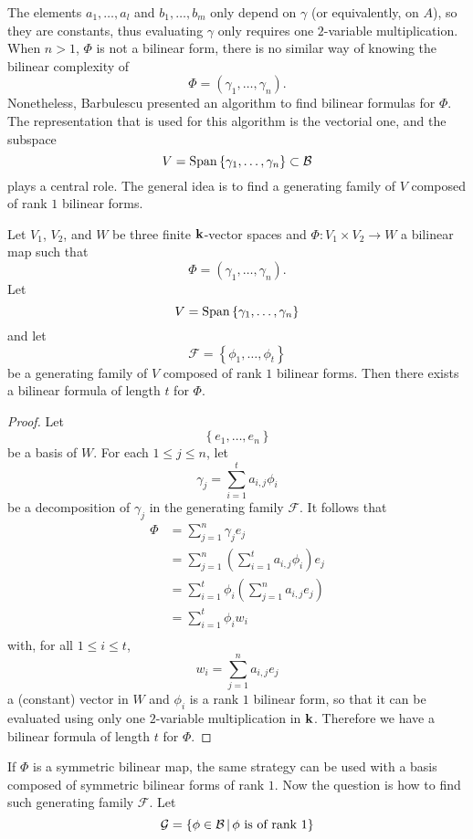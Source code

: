 The elements $a_1, \dots, a_l$ and $b_1, \dots, b_m$ only depend on $\gamma$ (or
equivalently, on $A$), so they are constants, thus evaluating $\gamma$ only
requires one $2$-variable multiplication.
When $n>1$, \ie $\Phi$ is not a
bilinear form, there is no similar way of knowing the bilinear complexity of
\[
  \Phi = (\gamma_1, \dots, \gamma_n).
\]
Nonetheless, Barbulescu \etal presented an algorithm to find bilinear formulas
for $\Phi$. The representation that is used for this algorithm is the vectorial
one, and the subspace
\[
  V = \operatorname{Span}\left\{ \gamma_1, \dots, \gamma_n \right\}\subset\mathcal{B}
\]
plays a central role. The general idea is to find a generating family of $V$ composed of
rank $1$ bilinear forms.
\begin{prop}
  Let $V_1$, $V_2$, and $W$ be three finite $\mathbf{k}$-vector spaces and $\Phi:V_1\times
  V_2\to W$ a bilinear map such that
  \[
    \Phi = (\gamma_1, \dots, \gamma_n).
  \]
  Let 
  \[
    V = \operatorname{Span}\left\{ \gamma_1, \dots, \gamma_n \right\}
  \]
  and let 
  \[
    \mathcal F = \left\{ \phi_1, \dots, \phi_t \right\}
  \]
  be a generating family of $V$ composed of rank $1$ bilinear forms. Then there
  exists a bilinear formula of length $t$ for $\Phi$.
\end{prop}
\begin{proof}
 Let 
 \[
   \left\{ e_1, \dots, e_n \right\}
 \]
 be a basis of $W$.  For each $1\leq j \leq n$, let
 \[
   \gamma_j = \sum_{i=1}^t a_{i, j} \phi_i
 \]
 be a decomposition of $\gamma_j$ in the generating family $\mathcal F$.
 It follows that
 \begin{align*}
   \Phi &= \sum_{j=1}^n\gamma_j e_j \\
   &= \sum_{j=1}^n (\sum_{i=1}^ta_{i, j}\phi_i)e_j\\
   &= \sum_{i=1}^t \phi_i (\sum_{j=1}^n a_{i, j}e_j)\\
   &= \sum_{i=1}^t \phi_i w_i\\
 \end{align*}
 with, for all $1\leq i\leq t$,
\[
  w_i = \sum_{j=1}^n a_{i, j}e_j
\]
a (constant) vector in $W$ and $\phi_i$ is a rank $1$ bilinear form, so that
it can be evaluated using only one $2$-variable multiplication in $\mathbf{k}$. Therefore
we have a bilinear formula of length $t$ for $\Phi$.
\end{proof}
If $\Phi$ is a symmetric bilinear map, the same strategy can be used with a
basis composed of symmetric bilinear forms of rank $1$. Now the question is how
to find such generating family $\mathcal F$. Let 
\[
  \mathcal{G} = \left\{ \phi\in\mathcal{B}\,|\,\phi\text{ is of rank }1 \right\}
\]

